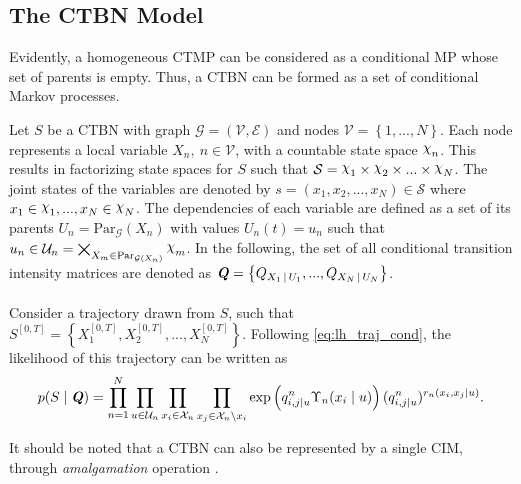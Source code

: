 \subsection{The CTBN Model}
Evidently, a homogeneous CTMP can be considered as a conditional MP whose set of parents is empty. Thus, a CTBN can be formed as a set of conditional Markov processes.\par
Let $ S $ be a CTBN with graph $ \mathcal{G} = (\mathcal{V}, \mathcal{E}) $ and nodes $ \mathcal{V} = \left\lbrace 1, ..., N\right\rbrace  $. Each node represents a local variable $ X_n, \ n\in \mathcal{V} $, with a countable state space $ \rchi_n $. This results in factorizing state spaces for $ S $ such that $ \mathcal{S} = 
\rchi_1 \times \rchi_2\times ...\times \rchi_N $. The joint states of the variables are denoted by $ s = (x_1, x_2, ..., x_N) \in \mathcal{S}$ where $ x_1 \in \rchi_1, ..., x_N \in \rchi_N $. The dependencies of each variable are defined as a set of its parents $ U_n = \mathrm{Par}_{\mathcal{G}}(X_n) $ with values $ U_n(t) = u_n $ such that $ u_n \in \mathcal{U}_n = \bigtimes_{X_m \in \mathrm{Par}_{\mathcal{G}(X_n)}} \rchi_m $. In the following, the set of all conditional transition intensity matrices are denoted as $ \textbf{\textit{Q}} = \left\lbrace Q_{X_1 \,|\, U_1}, ..., Q_{X_N \,|\, U_N}\right\rbrace  $. \\\\
Consider a trajectory drawn from $ S $, such that $ S^{[0, T]} = \left\lbrace X_1^{[0,T]},  X_2^{[0,T]}, ...,  X_N^{[0,T]}\right\rbrace  $. Following \autoref{eq:lh_traj_cond}, the likelihood of this trajectory can be written as
\begin{align}
p( S  \mid \textbf{\textit{Q}} ) = \prod_{n=1}^{N} \prod_{u \in \mathcal{U}_{n}} \prod_{x_i \in \mathcal{X}_{n}} \prod_{x_j \in \mathcal{X}_{n} \backslash x_i}
\exp \left(q_{i,j\mid u}^{n} \Upsilon_{n}(x_i\mid u)\right) (q_{i,j\mid u}^{n})^{r_{n}(x_i, x_j\mid u)}.
\label{eq:lh_CTBN}
\end{align}\par
It should be noted that a CTBN can also be represented by a single CIM, through \textit{amalgamation} operation \cite{Nodelman1995}.
